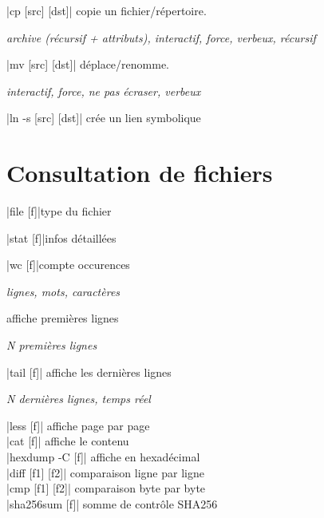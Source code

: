 \documentclass[9pt]{extarticle}
\newenvironment{cmdblock}{%
  \par\setlength{\parindent}{0pt}\setlength{\parskip}{0pt}%
  \RaggedRight%
}{\par}
\newlength{\cmdoptindent}
\newcommand{\cmdopt}[1]{%
  \hspace*{\cmdoptindent}%
  \begin{minipage}[t]{\dimexpr\linewidth-\cmdoptindent\relax}
    \RaggedRight \itshape #1%
  \end{minipage}\par
}
\begin{document}
\begin{multicols}{4}
\begin{cmdblock}
        \code|cp [src] [dst]| \quad copie un fichier/répertoire. \\
        \cmdopt{ archive (récursif + attributs),
            \codx{-i} interactif,
            \codx{-f} force,
            \codx{-v} verbeux,
            \codx{-r} récursif}
        \code|mv [src] [dst]| \quad déplace/renomme. \\
        \cmdopt{ interactif,
             force,
            \codx{-n} ne pas écraser,
            \codx{-v} verbeux}
        \code|ln -s [src] [dst]| \quad crée un lien symbolique \\
    \end{cmdblock}

    \section*{Consultation de fichiers}

    \begin{cmdblock}
        \code|file [f]|\quad type du fichier\par
        \code|stat [f]|\quad infos détaillées\par
        \code|wc [f]|\quad compte occurences\par
        \cmdopt{ lignes,  mots,  caractères}
        \quad affiche premières lignes\par
        \cmdopt{ N premières lignes}
        \code|tail [f]| \quad affiche les dernières lignes \\
        \cmdopt{ N dernières lignes,
             temps réel}
        \code|less [f]| \quad affiche page par page \\
        \code|cat [f]| \quad affiche le contenu \\
        \code|hexdump -C [f]| \quad affiche en hexadécimal \\
        \code|diff [f1] [f2]| \quad comparaison ligne par ligne \\
        \code|cmp [f1] [f2]| \quad comparaison byte par byte \\
        \code|sha256sum [f]| \quad somme de contrôle SHA256 \\
    \end{cmdblock}


\end{multicols}
\end{document}
